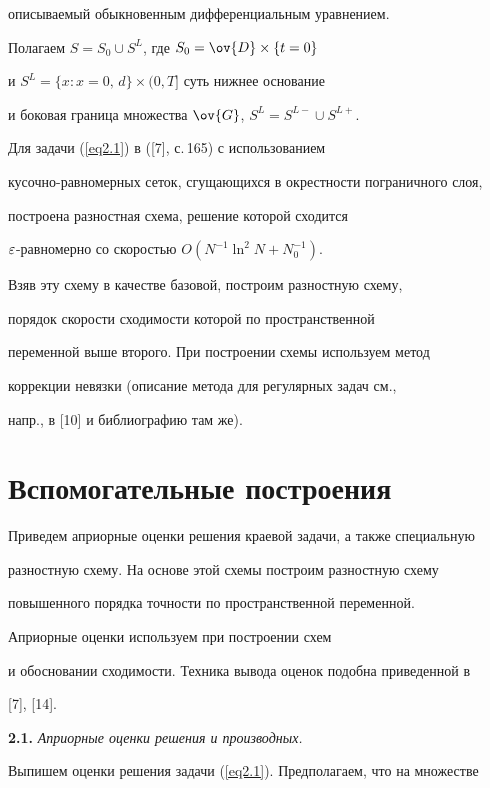 описываемый обыкновенным дифференциальным уравнением.


Полагаем $S=S_0\cup S^L$, где $S_0=\ov{D}\times\{t=0\}$


и $S^L=\{x:x=0,\,d\}\times (0,T]$ суть нижнее основание


и боковая граница множества $\ov{G}$, $S^L=S^{L-}\cup S^{L+}$.





Для задачи (\ref{eq2.1}) в ([7], с.\,165) с использованием


кусочно-равномерных сеток, сгущающихся в окрестности пограничного слоя,


построена разностная схема, решение которой сходится


$\varepsilon$-равномерно со скоростью $O(N^{-1}\ln^2N+N_0^{-1})$.


Взяв эту схему в качестве базовой, построим разностную схему,


порядок скорости сходимости которой по пространственной


переменной выше второго. При построении схемы используем метод


коррекции невязки (описание метода для регулярных задач см.,


напр., в [10] и библиографию там же).





\section{Вспомогательные построения}





Приведем априорные оценки решения краевой задачи, а также специальную


разностную схему. На основе этой схемы построим разностную схему


повышенного порядка точности по пространственной переменной.


Априорные оценки используем при построении схем


и обосновании сходимости. Техника вывода оценок подобна приведенной в


[7], [14].


\medskip





{\bf 2.1.} {\it Априорные оценки решения и производных.}


Выпишем оценки решения задачи (\ref{eq2.1}). Предполагаем, что на множестве


